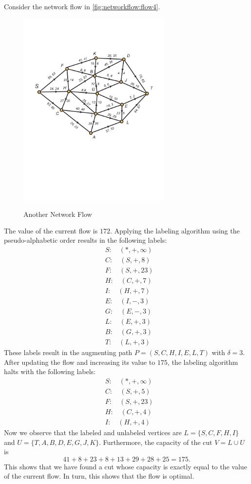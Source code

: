 Consider the network flow in \autoref{fig:networkflow:flow4}.
\begin{figure}
\begin{center}
\includegraphics*[viewport=40 250 576 660, width=3in]{networkflow-figs/network_flow4}\\
\caption{Another Network Flow\label{fig:networkflow:flow4}}
\end{center}
\end{figure}
The value of the current flow is $172$.  Applying the labeling
algorithm using the pseudo-alphabetic order results in the following
labels:
\begin{align*}
  &S:\quad(*,+,\infty)\\
  &C:\quad(S,+,8)\\
  &F:\quad(S,+,23)\\
  &H:\quad(C,+,7)\\
  &I:\quad(H,+,7)\\
  &E:\quad(I,-,3)\\
  &G:\quad(E,-,3)\\
  &L:\quad(E,+,3)\\
  &B:\quad(G,+,3)\\
  &T:\quad(L,+,3)
\end{align*}
These labels result in the augmenting path $P=(S,C,H,I,E,L,T)$ with
$\delta =3$. After updating the flow and increasing its value to
$175$, the labeling algorithm halts with the following labels:
\begin{align*}
  &S:\quad(*,+,\infty)\\
  &C:\quad(S,+,5)\\
  &F:\quad(S,+,23)\\
  &H:\quad(C,+,4)\\
  &I:\quad(H,+,4)
\end{align*}
Now we observe that the labeled and unlabeled vertices are
$L=\{S,C,F,H,I\}$ and $U=\{T,A,B,D,E,G,J,K\}$.  Furthermore, the
capacity of the cut $V=L\cup U$ is
\[
41+8+23+8+13+29+28+25 = 175. 
\]
This shows that we have found a cut whose capacity is exactly equal to
the value of the current flow.  In turn, this shows that the flow is
optimal.

